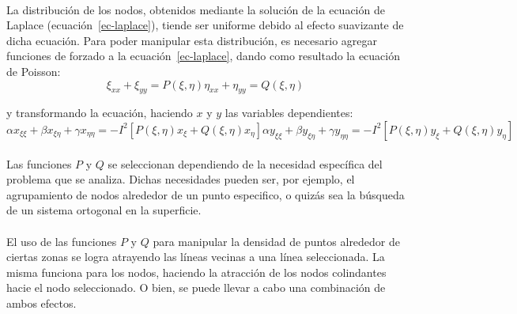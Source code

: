\documentclass[letterpaper, openright, 12pt]{book}
\begin{document}
    \paragraph*{}
        La distribución de los nodos, obtenidos mediante la solución de la
        ecuación de Laplace (ecuación~\ref{ec-laplace}), tiende ser uniforme
        debido al efecto suavizante de dicha ecuación. Para poder manipular esta
        distribución, es necesario agregar funciones de forzado a la
        ecuación~\ref{ec-laplace}, dando como resultado la ecuación de Poisson:
        \begin{subequations}
            \begin{equation}
                \xi_{xx} + \xi_{yy} = P(\xi, \eta)
            \end{equation}
            \begin{equation}
                \eta_{xx} + \eta_{yy} = Q(\xi, \eta)
            \end{equation}
            \label{ec-poisson}
        \end{subequations}

        y transformando la ecuación, haciendo $x$ y $y$ las variables
        dependientes:
        \begin{subequations}
            \begin{equation}
                \alpha x_{\xi \xi} + \beta x_{\xi \eta} + \gamma x_{\eta \eta} = -I^2 [P(\xi, \eta) x_{\xi} + Q(\xi, \eta) x_{\eta}]
            \end{equation}
            \begin{equation}
                \alpha y_{\xi \xi} + \beta y_{\xi \eta} + \gamma y_{\eta \eta} = -I^2 [P(\xi, \eta) y_{\xi} + Q(\xi, \eta) y_{\eta}]
            \end{equation}
            \label{ec-poisson-invertida}
        \end{subequations}

    \paragraph*{}
        Las funciones $P$ y $Q$ se seleccionan dependiendo de la necesidad
        específica del problema que se analiza. Dichas necesidades pueden ser,
        por ejemplo, el agrupamiento de nodos alrededor de un punto especifico,
        o quizás sea la búsqueda de un sistema ortogonal en la superficie.

    \paragraph*{}
        El uso de las funciones $P$ y $Q$ para manipular la densidad de puntos
        alrededor de ciertas zonas se logra atrayendo las líneas vecinas a una
        línea seleccionada. La misma funciona para los nodos, haciendo la
        atracción de los nodos colindantes hacie el nodo seleccionado. O bien,
        se puede llevar a cabo una combinación de ambos efectos.
\end{document}
